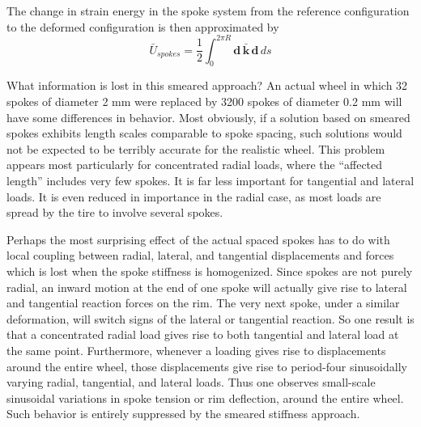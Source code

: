 \documentclass[\rootdir/thesis.tex]{subfiles}
\begin{document}
The change in strain energy in the spoke system from the reference configuration to the deformed configuration is then approximated by
\begin{equation}
\label{eq:U_spokes}
\bar{U}_{spokes} = \frac{1}{2}\int_0^{2\pi R} \mathbf{d}\, \mathbf{\bar{k}}\, \mathbf{d} \, ds
\end{equation}

What information is lost in this smeared approach? An actual wheel in which 32 spokes of diameter 2 mm were replaced by 3200 spokes of diameter 0.2 mm will have some differences in behavior.
Most obviously, if a solution based on smeared spokes exhibits length scales comparable to spoke spacing, such solutions would not be expected to be terribly accurate for the realistic wheel. This problem appears most particularly for concentrated radial loads, where the ``affected length'' includes very few spokes. It is far less important for tangential and lateral loads. It is even reduced in importance in the radial case, as most loads are spread by the tire to involve several spokes.

Perhaps the most surprising effect of the actual spaced spokes has to do with local coupling between radial, lateral, and tangential displacements and forces which is lost when the spoke stiffness is homogenized. Since spokes are not purely radial, an inward motion at the end of one spoke will actually give rise to lateral and tangential reaction forces on the rim. The very next spoke, under a similar deformation, will switch signs of the lateral or tangential reaction. So one result is that a concentrated radial load gives rise to both tangential and lateral load at the same point. Furthermore, whenever a loading gives rise to displacements around the entire wheel, those displacements give rise to period-four sinusoidally varying radial, tangential, and lateral loads. Thus one observes small-scale sinusoidal variations in spoke tension or rim deflection, around the entire wheel. Such behavior is entirely suppressed by the smeared stiffness approach.
\end{document}
